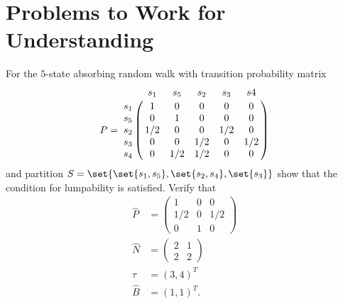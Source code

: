 \documentclass[12pt]{article}
\begin{document}


\hr

\section*{Problems to Work for Understanding}
\renewcommand{\theexerciseseries}{}
\renewcommand{\theexercise}{\arabic{exercise}}

\begin{exercise}
    For the \( 5 \)-state absorbing random walk with transition
    probability matrix
    \[
        P = \bordermatrix{ & s_1 & s_5 & s_2 & s_3 & s4 \cr
        s_1 & 1 & 0 & 0 & 0 & 0 \cr
        s_5 & 0 & 1 & 0 & 0 & 0 \cr
        s_2 & 1/2 & 0 & 0 &1/2 & 0 \cr
        s_3 & 0 & 0 & 1/2 & 0 & 1/2 \cr
        s_4 & 0 & 1/2 & 1/2 & 0 & 0 \cr
        }
    \] and partition \( S = \set{ \set{s_1, s_5}, \set{s_2, s_4}, \set{s_3}}
    \) show that the condition for lumpability is satisfied. Verify that
    \begin{align*}
        \hat{P} &=
        \begin{pmatrix}
            1 & 0 & 0 \\
            1/2 & 0 & 1/2 \\
            0 & 1 & 0
        \end{pmatrix}
        \\
        \hat{N} &=
        \begin{pmatrix}
            2 & 1 \\
            2 & 2
        \end{pmatrix}
        \\
        \hat{\tau} &= (3, 4)^T \\
        \hat{B} &= (1,1)^T.
    \end{align*}
\end{exercise}
\end{document}
